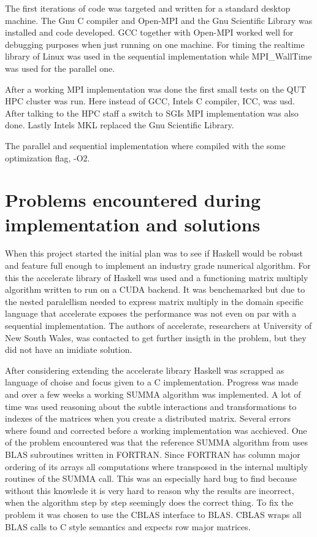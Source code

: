 \documentclass{article}
\begin{document}
The first iterations of code was targeted and written for a standard
desktop machine. The Gnu C compiler and Open-MPI and the Gnu Scientific Library
was installed and code developed. GCC together with Open-MPI worked well for
debugging purposes when just running on one machine. For timing the realtime
library of Linux was used in the sequential implementation while MPI_WallTime
was used for the parallel one.

After a working MPI implementation was done the first small tests on the
QUT HPC cluster was run. Here instead of GCC, Intels C compiler, ICC, was usd.
After talking to the HPC staff a switch to SGIs MPI implementation was also done.
Lastly Intels MKL replaced the Gnu Scientific Library.

The parallel and sequential implementation where compiled with the some optimization
flag, -O2.

\section{Problems encountered during implementation and solutions}
When this project started the initial plan was to see if Haskell\cite{haskell}
would be robust and feature full enough to implement an industry grade
numerical algorithm. For this the accelerate\cite{accelerate}
library of Haskell was used and a functioning matrix multiply algorithm written to run on a CUDA
backend. It was benchemarked but due to the nested paralellism needed to express matrix multiply
in the domain specific language that accelerate exposes the performance was not even on par
with a sequential implementation. The authors of accelerate, researchers at University of New South Wales,
was contacted to get further insigth in the problem, but they did not have an imidiate solution.

After considering extending the accelerate library Haskell was scrapped as language of choise and
focus given to a C implementation. Progress was made and over a few weeks a working SUMMA algorithm
was implemented. A lot of time was used reasoning about the subtle interactions and transformations
to indexes of the matrices when you create a distributed matrix. Several errors where found and
corrected before a working implementation was acchieved. One of the problem encountered was that
the reference SUMMA algorithm from \cite{summa} uses BLAS subroutines written in FORTRAN.
Since FORTRAN has column major ordering
of its arrays all computations where transposed in the internal multiply routines of the SUMMA call.
This was an especially hard bug to find because without this knowlede it is very hard to reason
why the results are incorrect, when the algorithm step by step seemingly does the correct thing.
To fix the problem it was chosen to use the CBLAS interface to BLAS. CBLAS wraps all BLAS calls
to C style semantics and expects row major matrices.
\end{document}

